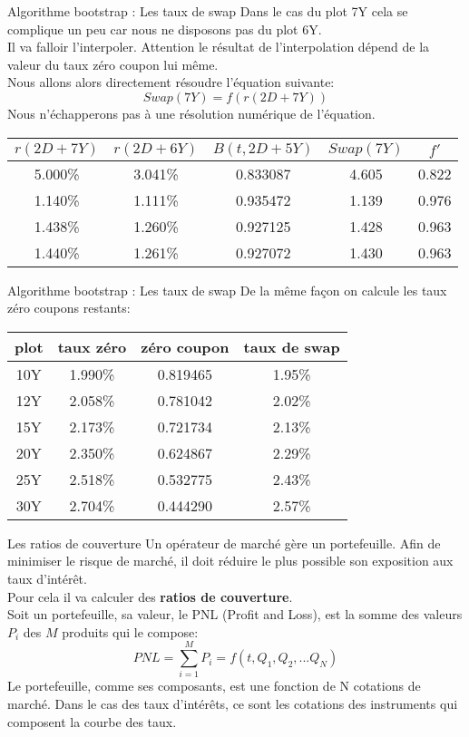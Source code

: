 \documentclass{beamer}
\begin{document}
\begin{frame}{Algorithme bootstrap : Les taux de swap}
Dans le cas du plot 7Y cela se complique un peu car nous ne disposons pas du plot 6Y.\\
Il va falloir l'interpoler. Attention le résultat de l'interpolation dépend de la valeur du taux zéro coupon lui même.\\
Nous allons alors directement résoudre l'équation suivante:
\[
Swap(7Y)=f(r(2D+7Y))
\]
\vspace{0.5cm}
Nous n'échapperons pas à une résolution numérique de l'équation.\\
\begin{tabular}{|c|c|c|c|c|}
\hline
$r(2D+7Y)$ & $r(2D+6Y)$ & $B(t,2D+5Y)$ & $Swap(7Y)$ & $f'$\\
\hline
5.000\% & 3.041\% & 0.833087 & 4.605 & 0.822\\ 
1.140\% & 1.111\% & 0.935472 & 1.139 & 0.976\\ 
1.438\% & 1.260\% & 0.927125 & 1.428 & 0.963\\ 
1.440\% & 1.261\% & 0.927072 & 1.430 & 0.963\\ 
\hline
\end{tabular}
\end{frame}

\begin{frame}{Algorithme bootstrap : Les taux de swap}
De la même façon on calcule les taux zéro coupons restants:
\begin{tabular}{|c|c|c|c|}
\hline
plot & taux zéro & zéro coupon & taux de swap \\
\hline
10Y & 1.990\% & 0.819465 & 1.95\% \\ 
12Y & 2.058\% & 0.781042 & 2.02\% \\ 
15Y & 2.173\% & 0.721734 & 2.13\% \\ 
20Y & 2.350\% & 0.624867 & 2.29\% \\ 
25Y & 2.518\% & 0.532775 & 2.43\% \\ 
30Y & 2.704\% & 0.444290 & 2.57\% \\ 
\hline
\end{tabular}
\end{frame}

\begin{frame}{Les ratios de couverture}
Un opérateur de marché gère un portefeuille. Afin de minimiser le risque de marché, il doit réduire le plus possible son exposition aux taux d'intérêt.\\
Pour cela il va calculer des \textbf{ratios de couverture}.\\
Soit un portefeuille, sa valeur, le PNL (Profit and Loss), est la somme des valeurs $P_i$ des $M$ produits qui le compose:
\[
PNL=\sum_{i=1}^{M}P_i=f(t,Q_1,Q_2,...Q_N)
\]
Le portefeuille, comme ses composants, est une fonction de N cotations de marché. Dans le cas des taux d'intérêts, ce sont les cotations des instruments qui composent la courbe des taux.
\end{frame}
\end{document}
